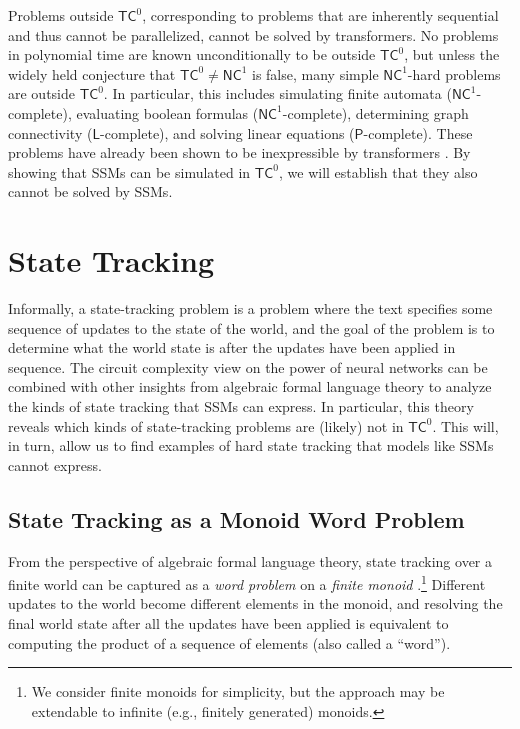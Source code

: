 Problems outside $\mathsf{TC}^0$, corresponding to problems that are inherently sequential and thus cannot be parallelized, cannot be solved by transformers. No problems in polynomial time are known unconditionally to be outside $\mathsf{TC}^0$, but unless the widely held conjecture that $\mathsf{TC}^0 \neq \mathsf{NC}^1$ is false, many simple $\mathsf{NC}^1$-hard problems are outside $\mathsf{TC}^0$. In particular, this includes simulating finite automata ($\mathsf{NC}^1$-complete), evaluating boolean formulas ($\mathsf{NC}^1$-complete), determining graph connectivity ($\mathsf{L}$-complete), and solving linear equations ($\mathsf{P}$-complete). These problems have already been shown to be inexpressible by transformers \citep{merrill-sabharwal-2023-parallelism}. By showing that SSMs can be simulated in $\mathsf{TC}^0$, we will establish that they also cannot be solved by SSMs.

\section{State Tracking} \label{sec:state-tracking}

Informally, a state-tracking problem is a problem where the text specifies some sequence of updates to the state of the world, and the goal of the problem is to determine what the world state is after the updates have been applied in sequence. The circuit complexity view on the power of neural networks can be combined with other insights from algebraic formal language theory to analyze the kinds of state tracking that SSMs can express. In particular, this theory reveals which kinds of state-tracking problems are (likely) not in $\mathsf{TC}^0$. This will, in turn, allow us to find examples of hard state tracking that models like SSMs cannot express.

\subsection{State Tracking as a Monoid Word Problem} \label{sec:word-problems}

 From the perspective of algebraic formal language theory, state tracking over a finite world can be captured as a \emph{word problem} on a \emph{finite monoid} \citep{liu2023transformers}.\footnote{We consider finite monoids for simplicity, but the approach may be extendable to infinite (e.g., finitely generated) monoids.} Different updates to the world become different elements in the monoid, and resolving the final world state after all the updates have been applied is equivalent to computing the product of a sequence of elements (also called a ``word'').

